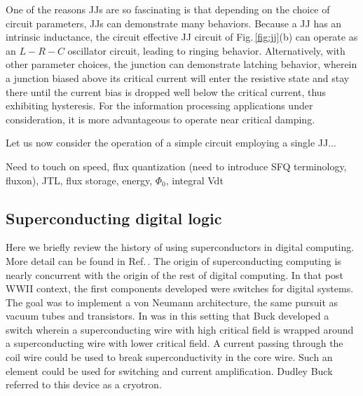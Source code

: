 \documentclass[twocolumn]{article}
\begin{document}
One of the reasons JJs are so fascinating is that depending on the choice of circuit parameters, JJs can demonstrate many behaviors. Because a JJ has an intrinsic inductance, the circuit effective JJ circuit of Fig.\,\ref{fig:jj}(b) can operate as an $L-R-C$ oscillator circuit, leading to ringing behavior. Alternatively, with other parameter choices, the junction can demonstrate latching behavior, wherein a junction biased above its critical current will enter the resistive state and stay there until the current bias is dropped well below the critical current, thus exhibiting hysteresis. For the information processing applications under consideration, it is more advantageous to operate near critical damping.

Let us now consider the operation of a simple circuit employing a single JJ...

Need to touch on speed, flux quantization (need to introduce SFQ terminology, fluxon), JTL, flux storage, energy, $\Phi_0$, integral Vdt

\subsection{Superconducting digital logic}
Here we briefly review the history of using superconductors in digital computing. More detail can be found in Ref.\,\cite{li2012}. The origin of superconducting computing is nearly concurrent with the origin of the rest of digital computing. In that post WWII context, the first components developed were switches for digital systems. The goal was to implement a von Neumann architecture, the same pursuit as vacuum tubes and transistors. In was in this setting that Buck developed a switch wherein a superconducting wire with high critical field is wrapped around a superconducting wire with lower critical field. A current passing through the coil wire could be used to break superconductivity in the core wire. Such an element could be used for switching and current amplification. Dudley Buck referred to this device as a cryotron.
\end{document}
